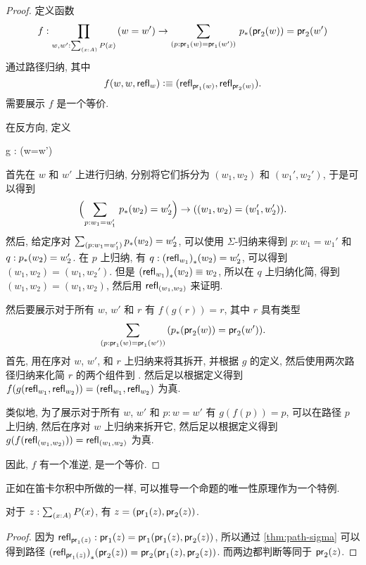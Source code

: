 \begin{proof}
    定义函数
    \begin{equation*}
        f : \prd{w,w':\sm{x:A}P(x)} (w=w') \to \dsm{p:\proj{1}(w)=\proj{1}(w')} \trans{p}{\proj{2}(w)}=\proj{2}(w')
    \end{equation*}
    通过路径归纳, 其中
    \begin{equation*}
        f(w,w,\mathsf{refl}_{w})\vcentcolon\equiv(\mathsf{refl}_{\mathsf{pr}_{1}(w)},\mathsf{refl}_{\mathsf{pr}_{2}(w)}).
    \end{equation*}
    需要展示 $f$ 是一个等价.

    在反方向, 定义
    \begin{narrowmultline*}
        g : 
        \to
        \narrowbreak
        (w=w')
    \end{narrowmultline*}
    首先在 $w$ 和 $w'$ 上进行归纳, 分别将它们拆分为 $(w_1,w_2)$ 和 $(w_1',w_2')$, 于是可以得到
    \begin{equation*}
        \Parens{\sm{p:w_1 = w_1'}\trans{p}{w_2}=w_2'} \to ((w_1,w_2)=(w_1',w_2')).
    \end{equation*}
    然后, 给定序对 $\sm{p:w_1 = w_1'}\trans{p}{w_2}=w_2'$, 可以使用 $\Sigma$-归纳来得到 $p : w_1 = w_1'$ 和 $q : {p}_{*}\mathopen{}\left({w_2}\right)\mathclose{}=w_2'$.
    在 $p$ 上归纳, 有 $q : {(\mathsf{refl}_{w_1})}_{*}\mathopen{}\left({w_2}\right)\mathclose{}=w_2'$, 可以得到 $(w_1,w_2)=(w_1,w_2')$.
    但是 ${(\mathsf{refl}_{w_1})}_{*}\mathopen{}\left({w_2}\right)\mathclose{} \equiv w_2$, 所以在 $q$ 上归纳化简, 得到 $(w_1,w_2)=(w_1,w_2)$, 然后用 $\mathsf{refl}_{(w_1,w_2)}$ 来证明.

    然后要展示对于所有 $w$, $w'$ 和 $r$ 有 $f(g(r))=r$, 其中 $r$ 具有类型
    \[\dsm{p:\proj{1}(w)=\proj{1}(w')} (\trans{p}{\proj{2}(w)}=\proj{2}(w')).\]
    首先, 用在序对 $w$, $w'$, 和 $r$ 上归纳来将其拆开, 并根据 $g$ 的定义, 然后使用两次路径归纳来化简 $r$ 的两个组件到 .
    然后足以根据定义得到
    $f (g(\mathsf{refl}_{w_1},\mathsf{refl}_{w_2})) = (\mathsf{refl}_{w_1},\mathsf{refl}_{w_2})$ 为真.

    类似地, 为了展示对于所有 $w$, $w'$ 和 $p : w = w'$ 有 $g(f(p))=p$, 可以在路径 $p$ 上归纳, 然后在序对 $w$ 上归纳来拆开它, 然后足以根据定义得到
    $g(f (\mathsf{refl}_{(w_1,w_2)})) = \mathsf{refl}_{(w_1,w_2)}$ 为真.

    因此, $f$ 有一个准逆, 是一个等价.
\end{proof}

正如在笛卡尔积中所做的一样, 可以推导一个命题的唯一性原理作为一个特例.

\begin{cor}
    \label{thm:eta-sigma}
    对于 $z:\sm{x:A} P(x)$, 有 $z = (\mathsf{pr}_{1}(z),\mathsf{pr}_{2}(z))$.
\end{cor}
\begin{proof}
    因为 $\mathsf{refl}_{\mathsf{pr}_{1}(z)} : \mathsf{pr}_{1}(z) = \mathsf{pr}_{1}(\mathsf{pr}_{1}(z),\mathsf{pr}_{2}(z))$, 所以通过 \cref{thm:path-sigma} 可以得到路径 ${(\mathsf{refl}_{\mathsf{pr}_{1}(z)})}_{*}\mathopen{}\left({\mathsf{pr}_{2}(z)}\right)\mathclose{} = \mathsf{pr}_{2}(\mathsf{pr}_{1}(z),\mathsf{pr}_{2}(z))$.
    而两边都判断等同于 $\mathsf{pr}_{2}(z)$.
\end{proof}

